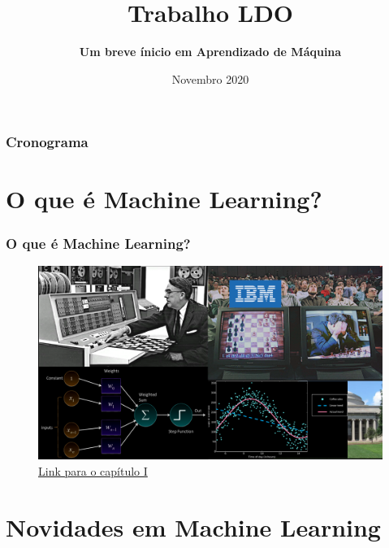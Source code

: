 \documentclass{beamer}
\title[LDO] %
{\textbf{Trabalho LDO}}
\subtitle{\textbf{Um breve ínicio em Aprendizado de Máquina}}
\institute[PUC] %
{
  \inst{1}%
  \emph{Pontifícia Universidade Católica de Minas Gerais}
  \\PUC-MG
}
\date[2020] %
{Novembro 2020}
\begin{document}
\frame{\titlepage}


\begin{frame}
    \frametitle{Cronograma}
    \tableofcontents
\end{frame}

\section{O que é Machine Learning?}

\begin{frame}
 
    \frametitle{O que é Machine Learning?}
    \begin{figure}[ht]
        \centering
        \includegraphics[scale=0.5]{Capitulo1.png}
        \caption{\href{./capitulos/Capitulo_01/Capitulo01.pdf}{Link para o capítulo I}}
    \end{figure}

\end{frame}

\section{Novidades em Machine Learning}
\end{document}
